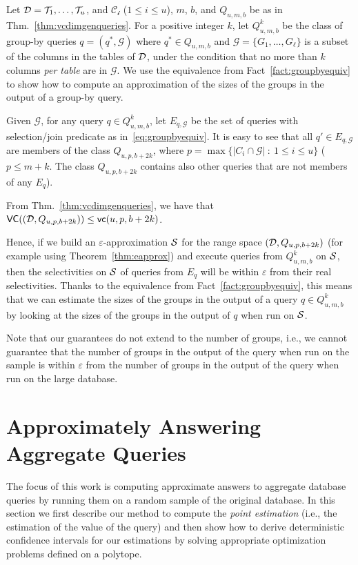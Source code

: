 Let ${\cal D}={{\cal T}_1,\dots,{\cal T}_u}$, and $\mathcal{C_i}$ ($1\le i \le u$), $m$, $b$,
and $Q_{u,m,b}$ be as in Thm.~\ref{thm:vcdimgenqueries}. For a positive integer
$k$, let $Q^k_{u,m,b}$ be the class of group-by queries $q=(q^*,\mathcal{G})$
where $q^*\in Q_{u,m,b}$ and $\mathcal{G}=\{G_1,\dots,G_\ell\}$ is a subset of
the columns in the tables of ${\cal D}$, under the condition that no more than $k$
columns \emph{per table} are in $\mathcal{G}$. We use the equivalence from
Fact~\ref{fact:groupbyequiv} to show how to compute an approximation of the
sizes of the groups in the output of a group-by query. 

Given $\mathcal{G}$, for any query $q\in Q^k_{u,m,b}$, let $E_{q,\mathcal{G}}$
be the set of queries with selection/join predicate as
in~\eqref{eq:groupbyequiv}. It is easy to see that all $q'\in E_{q,\mathcal{G}}$
are members of the class $Q_{u,p,b+2k}$, where $p=\max\{|C_i\cap\mathcal{G}|
~:~ 1\le i\le u\}$ ($p\le m+k$. The class $Q_{u,p,b+2k}$ contains also other
queries that are not members of any $E_q$). 
\begin{fact}
From Thm.~\ref{thm:vcdimgenqueries}, we have that $\mathsf{VC}(({\cal D},Q_{u,p,b+2k}))\le\mathsf{vc}(u,p,b+2k)$.
\end{fact}

Hence, if we build an $\varepsilon$-approximation ${\cal S}$ for the range space
$({\cal D},Q_{u,p,b+2k})$ (for example using Theorem~\ref{thm:eapprox}) and execute
queries from $Q^k_{u,m,b}$ on ${\cal S}$, then the selectivities on ${\cal S}$ of queries
from $E_q$ will be within $\varepsilon$ from their real selectivities. Thanks to
the equivalence from Fact~\ref{fact:groupbyequiv}, this means that we can
estimate the sizes of the groups in the output of a query $q\in Q^k_{u,m,b}$ by
looking at the sizes of the groups in the output of $q$ when run on ${\cal S}$.


Note that our guarantees do not extend to the number of groups, i.e., we cannot
guarantee that the number of groups in the output of the query when run on the
sample is within $\varepsilon$ from the number of groups in the output of the
query when run on the large database.

\section{Approximately Answering Aggregate Queries}\label{sec:aggreg}
The focus of this work is computing approximate answers to aggregate database
queries by running them on a random sample of the original database. In this
section we first describe our method to compute the \emph{point estimation}
(i.e., the estimation of the value of the query) and then show how to derive
deterministic confidence intervals for our estimations by solving appropriate
optimization problems defined on a polytope.

